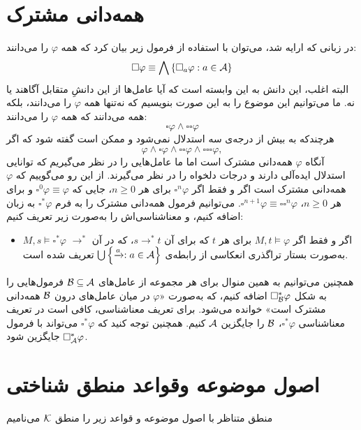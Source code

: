 \section{همه‌دانی مشترک}
در زبانی که ارایه شد، می‌توان با استفاده از فرمول زیر بیان کرد که همه $ \varphi $ را می‌دانند:
\begin{equation*}
 \square\varphi\equiv\bigwedge\left\lbrace \square_a\varphi : a\in\mathcal{A} \right\rbrace 
\end{equation*}
البته اغلب، این دانش به این وابسته است که آیا عامل‌ها از این دانشِ متقابل آگاهند یا نه. ما می‌توانیم این موضوع را به این صورت بنویسیم که نه‌تنها همه $ \varphi $ را می‌دانند، بلکه همه می‌دانند که همه $ \varphi $ را می‌دانند:
\begin{equation*}
\square\varphi\wedge\square\square\varphi
\end{equation*}
هرچندکه به بیش از درجه‌ی سه استدلال نمی‌شود و ممکن است گفته شود که اگر
\begin{equation*}
\varphi\wedge\square\varphi\wedge\square\square\varphi\wedge\square\square\square\varphi ,
\end{equation*}
آنگاه $ \varphi $ همه‌دانی مشترک است اما ما عامل‌هایی را در نظر می‌گیریم که توانایی استدلال ایده‌آلی دارند و درجات دلخواه را در نظر می‌گیرند. از این رو می‌گوییم که $ \varphi $ همه‌دانی مشترک است اگر و فقط اگر $ \square^n\varphi $ برای هر $ n\geqslant 0 $، جایی که $ \square^0\varphi\equiv\varphi $ و برای هر $ n\geqslant 0 $، $ \square^{n+1}\varphi\equiv\square\square^n\varphi $. می‌توانیم فرمول‌ همه‌دانی مشترک را به فرم $ \square^*\varphi $ به زبان اضافه کنیم، و معناشناسی‌اش را به‌صورت زیر تعریف کنیم:
\begin{itemize}
\item
$ M,s\vDash\square^*\varphi $ اگر و فقط اگر $ M,t\vDash\varphi $ برای هر $ t $ که برای آن $ s\rightarrow^* t $، که در آن $ \rightarrow^* $ به‌صورت بستار تراگذری انعکاسی از رابطه‌ی $ \bigcup\left\lbrace \xrightarrow{a}: a\in\mathcal{A}\right\rbrace $ تعریف شده است.
\end{itemize}

همچنین می‌توانیم به همین منوال برای هر مجموعه از عامل‌های $ \mathcal{B}\subseteq\mathcal{A} $ فرمول‌هایی را به شکل $ \square_{\mathcal{B}}^*\varphi $ اضافه کنیم، که به‌صورت «$ \varphi $ در میان عامل‌های درون $ \mathcal{B} $ همه‌دانی مشترک است» خوانده می‌شود.  برای تعریف معناشناسی، کافی است در تعریف معناشناسی $\square^*\varphi $، $ \mathcal{B} $ را جایگزین $ \mathcal{A} $ کنیم. همچنین توجه کنید که $ \square^*\varphi $ می‌تواند با فرمول $ \square_{\mathcal{A}}^*\varphi $ جایگزین شود.

\section{اصول موضوعه وقواعد منطق شناختی}
منطق متناظر با اصول موضوعه و قواعد زیر را منطق $ \mathcal{K} $ می‌نامیم
\\

